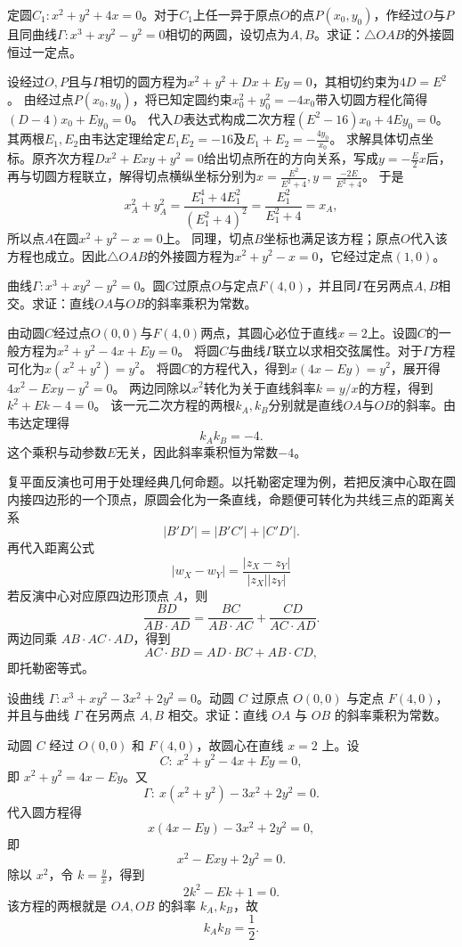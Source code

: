 \begin{example}
定圆$C_1: x^2+y^2+4x=0$。对于$C_1$上任一异于原点$O$的点$P(x_0, y_0)$，作经过$O$与$P$且同曲线$\Gamma: x^3+xy^2-y^2=0$相切的两圆，设切点为$A, B$。求证：$\triangle OAB$的外接圆恒过一定点。
\end{example}
\begin{solution}
设经过$O, P$且与$\Gamma$相切的圆方程为$x^2+y^2+Dx+Ey=0$，其相切约束为$4D=E^2$。
由经过点$P(x_0, y_0)$，将已知定圆约束$x_0^2+y_0^2=-4x_0$带入切圆方程化简得$(D-4)x_0+Ey_0=0$。
代入$D$表达式构成二次方程$(E^2-16)x_0+4Ey_0=0$。其两根$E_1, E_2$由韦达定理给定$E_1E_2=-16$及$E_1+E_2=-\frac{4y_0}{x_0}$。
求解具体切点坐标。原齐次方程$Dx^2+Exy+y^2=0$给出切点所在的方向关系，写成$y=-\frac{E}{2}x$后，再与切圆方程联立，解得切点横纵坐标分别为$x = \frac{E^2}{E^2+4}, y = \frac{-2E}{E^2+4}$。
于是
\[
x_A^2+y_A^2
=\frac{E_1^4+4E_1^2}{(E_1^2+4)^2}
=\frac{E_1^2}{E_1^2+4}
=x_A,
\]
所以点$A$在圆$x^2+y^2-x=0$上。
同理，切点$B$坐标也满足该方程；原点$O$代入该方程也成立。因此$\triangle OAB$的外接圆方程为$x^2+y^2-x=0$，它经过定点$(1, 0)$。
\end{solution}



\begin{example}
曲线$\Gamma: x^3+xy^2-y^2=0$。圆$C$过原点$O$与定点$F(4,0)$，并且同$\Gamma$在另两点$A, B$相交。求证：直线$OA$与$OB$的斜率乘积为常数。
\end{example}
\begin{solution}
由动圆$C$经过点$O(0,0)$与$F(4,0)$两点，其圆心必位于直线$x=2$上。设圆$C$的一般方程为$x^2+y^2-4x+Ey=0$。
将圆$C$与曲线$\Gamma$联立以求相交弦属性。对于$\Gamma$方程可化为$x(x^2+y^2) = y^2$。
将圆$C$的方程代入，得到$x(4x-Ey) = y^2$，展开得$4x^2-Exy-y^2=0$。
两边同除以$x^2$转化为关于直线斜率$k=y/x$的方程，得到$k^2+Ek-4=0$。
该一元二次方程的两根$k_A, k_B$分别就是直线$OA$与$OB$的斜率。由韦达定理得
\[
k_Ak_B = -4.
\]
这个乘积与动参数$E$无关，因此斜率乘积恒为常数$-4$。
\end{solution}

复平面反演也可用于处理经典几何命题。以托勒密定理为例，若把反演中心取在圆内接四边形的一个顶点，原圆会化为一条直线，命题便可转化为共线三点的距离关系
\[
|B'D'|=|B'C'|+|C'D'|.
\]
再代入距离公式
\[
|w_X-w_Y|=\frac{|z_X-z_Y|}{|z_X||z_Y|}
\]
若反演中心对应原四边形顶点 $A$，则
\[
\frac{BD}{AB\cdot AD}
=\frac{BC}{AB\cdot AC}+\frac{CD}{AC\cdot AD}.
\]
两边同乘 $AB\cdot AC\cdot AD$，得到
\[
AC\cdot BD=AD\cdot BC+AB\cdot CD,
\]
即托勒密等式。

\begin{example}
设曲线 $\Gamma: x^3 + xy^2 - 3x^2 + 2y^2 = 0$。动圆 $C$ 过原点 $O(0,0)$ 与定点 $F(4,0)$，并且与曲线 $\Gamma$ 在另两点 $A, B$ 相交。求证：直线 $OA$ 与 $OB$ 的斜率乘积为常数。
\end{example}
\begin{solution}
动圆 $C$ 经过 $O(0,0)$ 和 $F(4,0)$，故圆心在直线 $x=2$ 上。设
\[
C:\ x^2+y^2-4x+Ey=0,
\]
即 $x^2+y^2=4x-Ey$。又
\[
\Gamma:\ x(x^2+y^2)-3x^2+2y^2=0.
\]
代入圆方程得
\[
x(4x-Ey)-3x^2+2y^2=0,
\]
即
\[
x^2-Exy+2y^2=0.
\]
除以 $x^2$，令 $k=\frac yx$，得到
\[
2k^2-Ek+1=0.
\]
该方程的两根就是 $OA,OB$ 的斜率 $k_A,k_B$，故
\[
k_Ak_B=\frac12.
\]
\end{solution}


